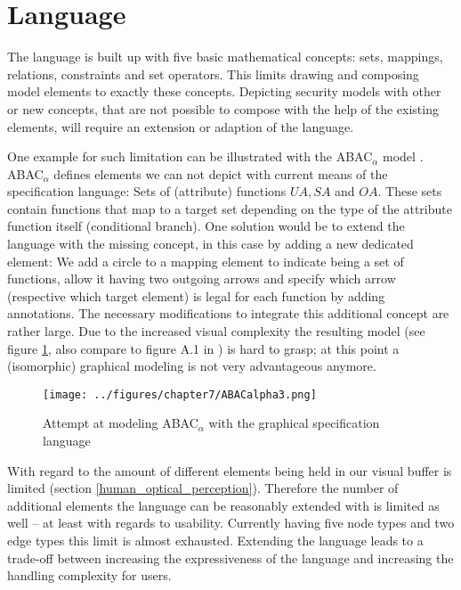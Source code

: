 \documentclass[twoside, openright, 12pt]{book}
\begin{document}
\section{Language}
\label{future_GSL}
The language is built up with five basic mathematical concepts: sets, mappings, relations, constraints and set operators.
This limits drawing and composing model elements to exactly these concepts.
Depicting security models with other or new concepts, that are not possible to compose with the help of the existing elements, will require an extension or adaption of the language.

One example for such limitation can be illustrated with the ABAC$_\alpha$ model \citep{Jin12}.
ABAC$_\alpha$ defines elements we can not depict with current means of the specification language: Sets of (attribute) functions $\mathit{UA}, \mathit{SA}$ and $\mathit{OA}$.
These sets contain functions that map to a target set depending on the type of the attribute function itself (conditional branch).
One solution would be to extend the language with the missing concept, in this case by adding a new dedicated element:
We add a circle to a mapping element to indicate being a set of functions, allow it having two outgoing arrows and specify which arrow (respective which target element) is legal for each function by adding annotations.
The necessary modifications to integrate this additional concept are rather large.
Due to the increased visual complexity the resulting model (see figure \ref{fig:ABACalpha}, also compare to figure A.1 in \cite{Amthor18}) is hard to grasp; at this point a (isomorphic) graphical modeling is not very advantageous anymore.

\begin{figure}[bht]
	\centering
	\texttt{[image: ../figures/chapter7/ABACalpha3.png]}
	\caption{Attempt at modeling ABAC$_\alpha$ with the graphical specification language}
	\label{fig:ABACalpha}
\end{figure}

With regard to \cite{Zeckzer14a} the amount of different elements being held in our visual buffer is limited (section \ref{human_optical_perception}).
Therefore the number of additional elements the language can be reasonably extended with is limited as well -- at least with regards to usability.
Currently having five node types and two edge types this limit is almost exhausted.
Extending the language leads to a trade-off between increasing the expressiveness of the language and increasing the handling complexity for users.
\end{document}
